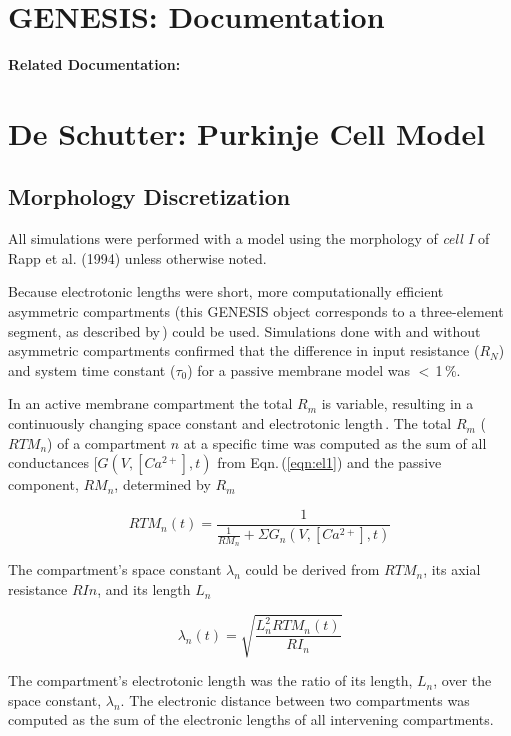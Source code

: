 \documentclass[12pt]{article}
\begin{document}
\section*{GENESIS: Documentation}

{\bf Related Documentation:}

\section*{De Schutter: Purkinje Cell Model}


\subsection*{Morphology Discretization}

All simulations were performed with a model using the morphology of {\it cell I} of Rapp et
al. (1994) unless otherwise noted.
   
Because electrotonic
lengths were short, more computationally
efficient asymmetric compartments (this GENESIS object corresponds
to a three-element segment, as described by\,\cite{Segev-I:1985kl}) could be used. Simulations done with and without asymmetric compartments
confirmed that the difference in input resistance ($R_N$) and
system time constant ($\tau_0$) for a passive membrane model was
$<$\,1\,\%.

In an active membrane compartment the total $R_m$ is variable,
resulting in a continuously changing space constant and electrotonic 
length\,\cite{Bernander-O:1991tg, Rapp-M:1992kx}.
The total $R_m$ ($RTM_n$) of a compartment $n$ at a specific time was
computed as the sum of all conductances $[ G(V, [ Ca^{2+}] ,t)$ from Eqn.\,(\ref{eqn:el1}) and the passive component, $RM_n$, determined by $R_m$

\begin{equation}
\label{eqn:el1}
   RTM_n(t) = \frac{1}{\frac{1}{RM_n}+\Sigma G_n(V,[ Ca^{2+}] ,t)}
\end{equation}

The compartment's space constant $\lambda_n$ could be derived from $RTM_n$, its axial resistance $RIn$, and its length $L_n$

\begin{equation}
   \lambda_n(t) = \sqrt{\frac{L^2_nRTM_n(t)}{RI_n}}
\end{equation}

The compartment's electrotonic length was the ratio of its length, 
$L_n$, over the space constant, $\lambda_n$. The electronic distance
between two compartments was computed as the sum of the electronic
lengths of all intervening compartments.
\end{document}
